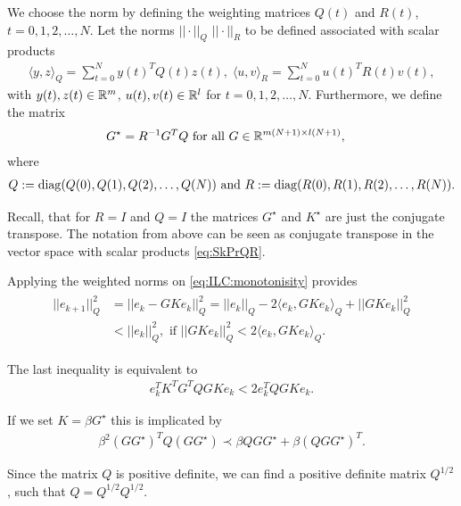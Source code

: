 We choose the norm by defining the weighting matrices  $Q(t)$ and $R(t)$, $t = 0, 1, 2, \dots ,N$. Let the norms $||\cdot||_Q$ $||\cdot||_R$ to be defined associated with scalar products 
\begin{align}
\label{eq:SkPrQR}
\langle y,z\rangle_Q = \sum_{t = 0}^N y(t)^TQ(t)z(t), \; \langle u,v\rangle_R = \sum_{t = 0}^N u(t)^T R(t) v(t),
\end{align}
with $y(t), z(t) \in {\mathbb{R}}^{m}$, $u(t), v(t) \in {\mathbb{R}}^l$ for $t = 0,1,2, \dots, N$.
Furthermore, we define the matrix 
\begin{align*}
G^\star &= R^{-1} G^T Q \text{ for all } G \in {\mathbb{R}}^{m(N+1)\times l(N+1)},
\end{align*}
where 
\begin{align}
Q := \operatorname*{diag}(Q(0), Q(1), Q(2) ,\dots, Q(N)) \text{ and } R:= \operatorname*{diag}(R(0), R(1), R(2), \dots, R(N)).
\end{align}


Recall, that for $R = I$ and $Q = I$ the matrices $G^\star$ and $K^\star$ are just the conjugate transpose. The notation from above can be seen as conjugate transpose in the vector space with scalar products \eqref{eq:SkPrQR}.

Applying the weighted norms on \eqref{eq:ILC:monotonisity} provides
\begin{align}
\begin{split}
||e_{k+1} ||_Q^2 &= ||e_k - G K e_k||_Q^2 = ||e_k||_Q - 2\langle e_k , G K e_k \rangle_Q + ||G K e_k||_Q^2 \\ 
&< ||e_k||_Q^2, \text{ if } ||GK e_k||_Q^2 < 2 \langle e_k, GK e_k\rangle_Q. 
\end{split}
\end{align}

The last inequality is equivalent to 
\begin{align}
e_k^T K^T G^T Q GK e_k < 2 e_k^T Q GK e_k.
\end{align}

If we set $K = \beta G^{\star}$ this is implicated by 
\begin{align}
\label{eq:ILC:SDA_Herleitung}
\beta^2 (G G^{\star})^T Q (G G^{\star}) \prec \beta Q G G^{\star} + \beta (Q G G^{\star})^T.
\end{align}

Since the matrix $Q$ is positive definite, we can find a positive definite 	 matrix $Q^{1/2}$, such that $Q = Q^{1/2}Q^{1/2}$. 

